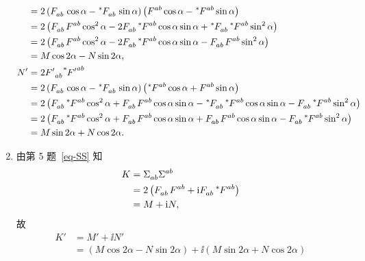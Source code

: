\begin{xiti}
\begin{zm}
\begin{enumerate}[label = (\alph*)]
\begin{align*}
					&= 2 \left( \tensor{F}{_a_b} \cos \alpha - \tensor[^*]{F}{_a_b} \sin \alpha \right) \left( \tensor{F}{^a^b} \cos \alpha - \tensor[^*]{F}{^a^b} \sin \alpha \right)\\
					&= 2 \left( \tensor[]{F}{_a_b} \tensor[]{F}{^a^b} \cos^2 \alpha - 2 \tensor{F}{_a_b} \tensor[^*]{F}{^a^b} \cos \alpha \sin \alpha + \tensor[^*]{F}{_a_b} \tensor[^*]{F}{^a^b} \sin^2 \alpha \right)\\
					&= 2 \left( \tensor[]{F}{_a_b} \tensor[]{F}{^a^b} \cos^2 \alpha - 2 \tensor{F}{_a_b} \tensor[^*]{F}{^a^b} \cos \alpha \sin \alpha - \tensor{F}{_a_b} \tensor{F}{^a^b} \sin^2 \alpha \right)\\
					&= M \cos 2\alpha - N \sin 2 \alpha,\\
					N' &= 2 \tensor{{F'}}{_a_b} \tensor[^*]{{F'}}{^a^b}\\
					&= 2 \left( \tensor{F}{_a_b} \cos \alpha - \tensor[^*]{F}{_a_b} \sin \alpha \right) \left( \tensor[^*]{F}{^a^b} \cos \alpha + \tensor{F}{^a^b} \sin \alpha \right)\\
					&= 2 \left( \tensor{F}{_a_b} \tensor[^*]{F}{^a^b} \cos^2 \alpha + \tensor{F}{_a_b} \tensor{F}{^a^b} \cos \alpha \sin \alpha - \tensor[^*]{F}{_a_b} \tensor[^*]{F}{^a^b} \cos \alpha \sin \alpha - \tensor{F}{_a_b} \tensor[^*]{F}{^a^b} \sin^2 \alpha \right)\\
					&= 2 \left( \tensor{F}{_a_b} \tensor[^*]{F}{^a^b} \cos^2 \alpha + \tensor{F}{_a_b} \tensor{F}{^a^b} \cos \alpha \sin \alpha + \tensor{F}{_a_b} \tensor{F}{^a^b} \cos \alpha \sin \alpha - \tensor{F}{_a_b} \tensor[^*]{F}{^a^b} \sin^2 \alpha \right)\\
					&= M \sin 2 \alpha + N \cos 2\alpha.
			\end{align*}
			\item 由第 5 题~\eqref{eq-SS} 知
			\begin{equation*}
				\begin{split}
					K &= \tensor{\Sigma}{_a_b} \tensor{\Sigma}{^a^b}\\
					&= 2 \left( \tensor{F}{_a_b} \tensor{F}{^a^b} + \ii \tensor{F}{_a_b} \tensor[^*]{F}{^a^b} \right)\\
					&= M + \ii N,
				\end{split}
			\end{equation*}
			故
			\begin{equation*}
				\begin{split}
					K' &= M' + \ii N'\\
					&= \left( M \cos 2\alpha - N \sin 2 \alpha \right) + \ii \left( M \sin 2 \alpha + N \cos 2\alpha \right)\\

\end{split}
\end{equation*}
\end{enumerate}
\end{zm}
\end{xiti}
